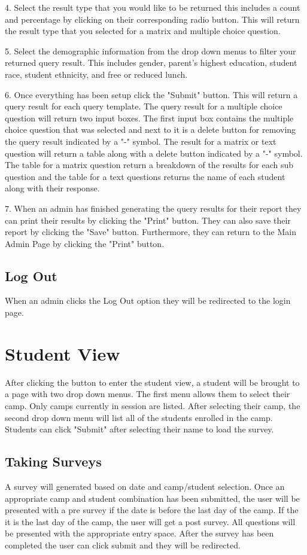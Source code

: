 \documentclass[letterpaper,10pt,serif, draftclsnofoot,onecolumn, compsoc, titlepage]{IEEEtran}
\begin{document}
4. Select the result type that you would like to be returned this includes a count and percentage by clicking on their corresponding radio button. This will return the result type that you selected for a matrix and multiple choice question.

5. Select the demographic information from the drop down menus to filter your returned query result. This includes gender, parent's highest education, student race, student ethnicity, and free or reduced lunch. 

6. Once everything has been setup click the "Submit" button. This will return a query result for each query template. The query result for a multiple choice question will return two input boxes. The first input box contains the multiple choice question that was selected and next to it is a delete button for removing the query result indicated by a "-" symbol.  The result for a matrix or text question will return a table along with a delete button indicated by a "-" symbol. The table for a matrix question return a breakdown of the results for each sub question and the table for a text questions returns the name of each student along with their response. 

7. When an admin has finished generating the query results for their report they can print their results by clicking the "Print" button. They can also save their report by clicking the "Save" button. Furthermore, they can return to the Main Admin Page by clicking the "Print" button. 
\subsection{Log Out}
When an admin clicks the Log Out option they will be redirected to the login page. 
\section{Student View}
After clicking the button to enter the student view, a student will be brought to a page with two drop down menus.
The first menu allows them to select their camp.
Only camps currently in session are listed.
After selecting their camp, the second drop down menu will list all of the students enrolled in the camp.
Students can click "Submit" after selecting their name to load the survey.
\subsection{Taking Surveys}
A survey will generated based on date and camp/student selection. Once an appropriate camp and student combination 
has been submitted, the user will be presented with a pre survey if the date is before the last day of the camp. If 
the it is the last day of the camp, the user will get a post survey. All questions will be presented with the 
appropriate entry space. After the survey has been completed the user can click submit and they will be redirected.
\end{document}
